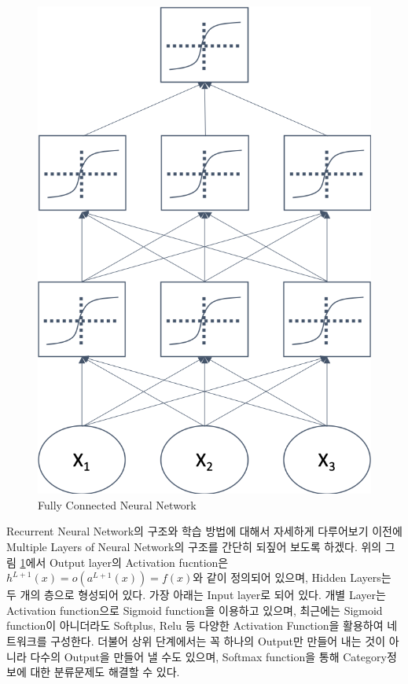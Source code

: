 \documentclass[draft=false]{oblivoir}
\begin{document}
\begin{figure}[ht] \centering 
  \includegraphics[scale=0.5]{fig3.png}
  \caption{Fully Connected Neural Network}
  \label{fig:16-3}
\end{figure}
 
 Recurrent Neural Network의 구조와 학습 방법에 대해서 자세하게 다루어보기 이전에 Multiple Layers of Neural Network의 구조를 간단히 되짚어 보도록 하겠다. 위의 그림 \ref{fig:16-3}에서 Output layer의 Activation fucntion은 $h^{L+1}(x) = o (a^{L+1}(x)) = f(x)$와 같이 정의되어 있으며, Hidden Layers는 두 개의 층으로 형성되어 있다. 가장 아래는 Input layer로 되어 있다. 개별 Layer는 Activation function으로 Sigmoid function을 이용하고 있으며, 최근에는 Sigmoid function이 아니더라도 Softplus, Relu 등 다양한 Activation Function을 활용하여 네트워크를 구성한다. 더불어 상위 단계에서는 꼭 하나의 Output만 만들어 내는 것이 아니라 다수의 Output을 만들어 낼 수도 있으며, Softmax function을 통해 Category정보에 대한 분류문제도 해결할 수 있다. 
 
\end{document}

